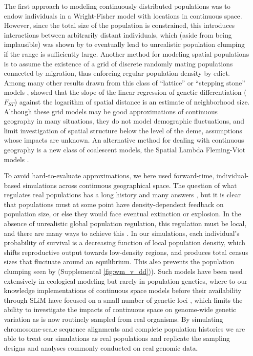 \documentclass[10pt,twoside,lineno,hidelinks]{preprint}
\begin{document}
The first approach to modeling continuously distributed populations
was to endow individuals in a Wright-Fisher model with locations in continuous space.
However, since the total size of the population is constrained, this introduces interactions between arbitrarily distant individuals,
which (aside from being implausible) 
was shown by \citet{Felsenstein1975} to eventually lead to unrealistic population clumping
if the range is sufficiently large.
Another method for modeling spatial populations is to assume the existence of a grid of discrete randomly mating populations connected by migration, 
thus enforcing regular population density by edict.
Among many other results drawn from this class of ``lattice'' or ``stepping stone'' models
\citep{epperson2003geographical}, 
\citet{Rousset1997} showed that the slope of the linear regression of genetic differentiation ($F_{ST}$) against the logarithm of spatial distance is an estimate of neighborhood size. 
Although these grid models may be good approximations of continuous geography in many situations,
they do not model demographic fluctuations,
and limit investigation of spatial structure below the level of the deme,
assumptions whose impacts are unknown. 
An alternative method for dealing with continuous geography is a new class of coalescent models,
the Spatial Lambda Fleming-Viot models \citep{Barton2010,Kelleher2014}.

To avoid hard-to-evaluate approximations, we here used forward-time, individual-based simulations
across continuous geographical space.
The question of what regulates real populations has a long history and many answers
\citep[e.g.,][]{lloyd1967crowding,antonovics1980ecological,crawley1990population}, 
but it is clear that populations must at some point have density-dependent feedback on population size,
or else they would face eventual extinction or explosion.
In the absence of unrealistic global population regulation,
this regulation must be local,
and there are many ways to achieve this \citep{bolker2003spatial}.
In our simulations,
each individual's probability of survival is a decreasing function of local population density,
which shifts reproductive output towards low-density regions,
and produces total census sizes that fluctuate around an equilibrium. 
This also prevents the population clumping seen by \citet{Felsenstein1975}
(Supplemental \autoref{fig:wm_v_dd})). 
Such models have been used extensively in ecological modeling
\citep{durrett1994importance,bolker1997using,law2003population,fournier2004microscopic,champer2019suppression}
but rarely in population genetics, 
where to our knowledge implementations of continuous space models
before their availability through SLiM \citep{Haller2019}
have focused on a small number of genetic loci
\citep[e.g.,][]{slatkin1989comparison,barton2002neutral,robledoarnuncio2010isolation,rossine2014espao,jackson2014landscape},
which limits the ability to investigate the impacts of continuous space on genome-wide genetic variation as is now routinely sampled from real organisms. 
By simulating chromosome-scale sequence alignments and complete population histories we are able to treat our simulations as real populations and replicate the sampling designs and analyses commonly conducted on real genomic data.
\end{document}
